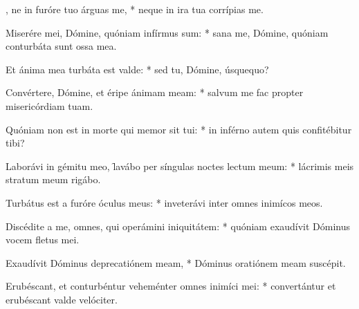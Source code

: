 \begin{psalmus}

, ne in furóre tuo árguas me, * neque in ira tua corrípias me.

Miserére mei, Dómine, quóniam infírmus sum: * sana me, Dómine, quóniam conturbáta sunt ossa mea.

Et ánima mea turbáta est valde: * sed tu, Dómine, úsquequo?

Convértere, Dómine, et éripe ánimam meam: * salvum me fac propter misericórdiam tuam.

Quóniam non est in morte qui memor sit tui: * in inférno autem quis confitébitur tibi?

Laborávi in gémitu meo, \f lavábo per síngulas noctes lectum meum: * lácrimis meis stratum meum rigábo.

Turbátus est a furóre óculus meus: * inveterávi inter omnes inimícos meos.

Discédite a me, omnes, qui operámini iniquitátem: * quóniam exaudívit Dóminus vocem fletus mei.

Exaudívit Dóminus deprecatiónem meam, * Dóminus oratiónem meam suscépit.

Erubéscant, et conturbéntur veheménter omnes inimíci mei: * convertántur et erubéscant valde velóciter.

\end{psalmus}
